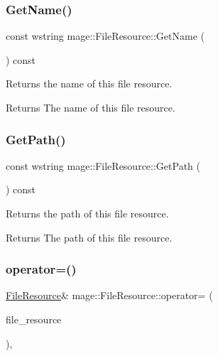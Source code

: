 \subsubsection{\texorpdfstring{Get\+Name()}{GetName()}}
{\footnotesize\ttfamily const wstring mage\+::\+File\+Resource\+::\+Get\+Name (\begin{DoxyParamCaption}{ }\end{DoxyParamCaption}) const}

Returns the name of this file resource.

\begin{DoxyReturn}{Returns}
The name of this file resource. 
\end{DoxyReturn}
\hypertarget{classmage_1_1_file_resource_a6dd2da5d50dbe8b3ac4189cdaa5fc325}{}\label{classmage_1_1_file_resource_a6dd2da5d50dbe8b3ac4189cdaa5fc325} 
\subsubsection{\texorpdfstring{Get\+Path()}{GetPath()}}
{\footnotesize\ttfamily const wstring mage\+::\+File\+Resource\+::\+Get\+Path (\begin{DoxyParamCaption}{ }\end{DoxyParamCaption}) const}

Returns the path of this file resource.

\begin{DoxyReturn}{Returns}
The path of this file resource. 
\end{DoxyReturn}
\hypertarget{classmage_1_1_file_resource_a195da42fa3a40991e7c38cf8305b0bf2}{}\label{classmage_1_1_file_resource_a195da42fa3a40991e7c38cf8305b0bf2} 
\subsubsection{\texorpdfstring{operator=()}{operator=()}\hspace{0.1cm}{\footnotesize\ttfamily [1/2]}}
{\footnotesize\ttfamily \hyperlink{classmage_1_1_file_resource}{File\+Resource}\& mage\+::\+File\+Resource\+::operator= (\begin{DoxyParamCaption}\item[{const \hyperlink{classmage_1_1_file_resource}{File\+Resource} \&}]{file\+\_\+resource }\end{DoxyParamCaption})\hspace{0.3cm}{\ttfamily [private]}, {\ttfamily [delete]}}

